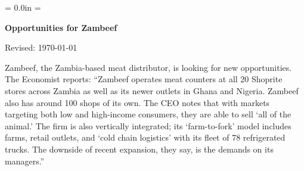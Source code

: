 \documentclass[12pt]{article}
\def\HeadName{Opportunities for Zambeef}
\begin{document}
\parindent = 0.0in
\parskip = \bigskipamount
\thispagestyle{empty}%
\Head

\centerline{\large \bf \HeadName}%
\centerline{Revised:  \today}

\bigskip
Zambeef, the Zambia-based meat distributor, is looking for new opportunities.
The Economist reports:
``Zambeef operates meat counters at all 20 Shoprite stores across Zambia
as well as its newer outlets in Ghana and Nigeria.
Zambeef also has around 100 shops of its own.
The CEO notes that with markets targeting both low and high-income consumers,
they are able to sell `all of the animal.'
The firm is also vertically integrated;
its `farm-to-fork' model includes farms, retail outlets,
and `cold chain logistics' with its fleet of 78 refrigerated trucks.
The downside of recent expansion, they say, is the demands on its managers.''
\end{document}
